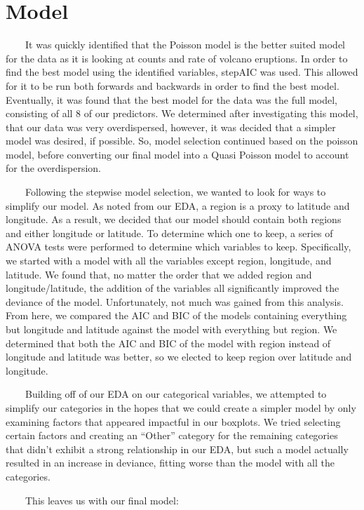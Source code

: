 \documentclass[
  12pt,
]{article}
\begin{document}
\section{Model}\label{model}

~~~~It was quickly identified that the Poisson model is the better
suited model for the data as it is looking at counts and rate of volcano
eruptions. In order to find the best model using the identified
variables, stepAIC was used. This allowed for it to be run both forwards
and backwards in order to find the best model. Eventually, it was found
that the best model for the data was the full model, consisting of all 8
of our predictors. We determined after investigating this model, that
our data was very overdispersed, however, it was decided that a simpler
model was desired, if possible. So, model selection continued based on
the poisson model, before converting our final model into a Quasi
Poisson model to account for the overdispersion.

~~~~Following the stepwise model selection, we wanted to look for ways
to simplify our model. As noted from our EDA, a region is a proxy to
latitude and longitude. As a result, we decided that our model should
contain both regions and either longitude or latitude. To determine
which one to keep, a series of ANOVA tests were performed to determine
which variables to keep. Specifically, we started with a model with all
the variables except region, longitude, and latitude. We found that, no
matter the order that we added region and longitude/latitude, the
addition of the variables all significantly improved the deviance of the
model. Unfortunately, not much was gained from this analysis. From here,
we compared the AIC and BIC of the models containing everything but
longitude and latitude against the model with everything but region. We
determined that both the AIC and BIC of the model with region instead of
longitude and latitude was better, so we elected to keep region over
latitude and longitude.

~~~~Building off of our EDA on our categorical variables, we attempted
to simplify our categories in the hopes that we could create a simpler
model by only examining factors that appeared impactful in our boxplots.
We tried selecting certain factors and creating an ``Other'' category
for the remaining categories that didn't exhibit a strong relationship
in our EDA, but such a model actually resulted in an increase in
deviance, fitting worse than the model with all the categories.

~~~~This leaves us with our final model:
\end{document}
